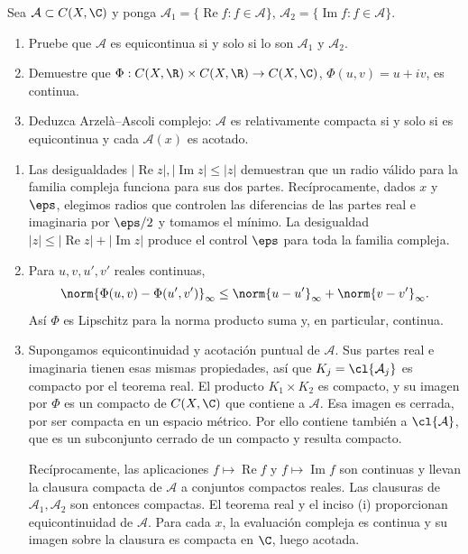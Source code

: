 \begin{ejercicio}
Sea $\mathcal A\subset C(X,\C)$ y ponga $\mathcal A_1=\{\operatorname{Re}f:f\in\mathcal A\}$, $\mathcal A_2=\{\operatorname{Im}f:f\in\mathcal A\}$.
\begin{enumerate}[label=(\roman*)]
\item Pruebe que $\mathcal A$ es equicontinua si y solo si lo son $\mathcal A_1$ y $\mathcal A_2$.
\item Demuestre que $\Phi:C(X,\R)\times C(X,\R)\to C(X,\C)$, $\Phi(u,v)=u+iv$, es continua.
\item Deduzca Arzelà--Ascoli complejo: $\mathcal A$ es relativamente compacta si y solo si es equicontinua y cada $\mathcal A(x)$ es acotado.
\end{enumerate}
\end{ejercicio}
\begin{solucion}
\begin{enumerate}[label=(\roman*)]
\item Las desigualdades $|\operatorname{Re}z|,|\operatorname{Im}z|\le|z|$ demuestran que un radio válido para la familia compleja funciona para sus dos partes. Recíprocamente, dados $x$ y $\eps$, elegimos radios que controlen las diferencias de las partes real e imaginaria por $\eps/2$ y tomamos el mínimo. La desigualdad $|z|\le|\operatorname{Re}z|+|\operatorname{Im}z|$ produce el control $\eps$ para toda la familia compleja.
\item Para $u,v,u',v'$ reales continuas,
\[
 \norm{\Phi(u,v)-\Phi(u',v')}_\infty
 \le\norm{u-u'}_\infty+\norm{v-v'}_\infty.
\]
Así $\Phi$ es Lipschitz para la norma producto suma y, en particular, continua.
\item Supongamos equicontinuidad y acotación puntual de $\mathcal A$. Sus partes real e imaginaria tienen esas mismas propiedades, así que $K_j=\cl{\mathcal A_j}$ es compacto por el teorema real. El producto $K_1\times K_2$ es compacto, y su imagen por $\Phi$ es un compacto de $C(X,\C)$ que contiene a $\mathcal A$. Esa imagen es cerrada, por ser compacta en un espacio métrico. Por ello contiene también a $\cl{\mathcal A}$, que es un subconjunto cerrado de un compacto y resulta compacto.

Recíprocamente, las aplicaciones $f\mapsto\operatorname{Re}f$ y $f\mapsto\operatorname{Im}f$ son continuas y llevan la clausura compacta de $\mathcal A$ a conjuntos compactos reales. Las clausuras de $\mathcal A_1,\mathcal A_2$ son entonces compactas. El teorema real y el inciso (i) proporcionan equicontinuidad de $\mathcal A$. Para cada $x$, la evaluación compleja es continua y su imagen sobre la clausura es compacta en $\C$, luego acotada.
\end{enumerate}
\end{solucion}

